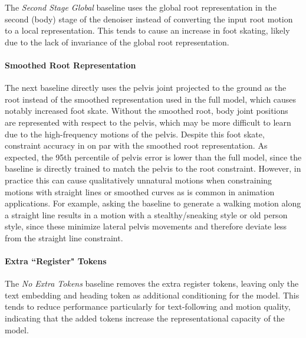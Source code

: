 The \textit{Second Stage Global} baseline uses the global root representation in the second (body) stage of the denoiser instead of converting the input root motion to a local representation. This tends to cause an increase in foot skating, likely due to the lack of invariance of the global root representation.

\paragraph{Smoothed Root Representation}
The next baseline directly uses the pelvis joint projected to the ground as the root instead of the smoothed representation used in the full model, which causes notably increased foot skate.
Without the smoothed root, body joint positions are represented with respect to the pelvis, which may be more difficult to learn due to the high-frequency motions of the pelvis.
Despite this foot skate, constraint accuracy in on par with the smoothed root representation.
As expected, the 95th percentile of pelvis error is lower than the full model, since the baseline is directly trained to match the pelvis to the root constraint. 
However, in practice this can cause qualitatively unnatural motions when constraining motions with straight lines or smoothed curves as is common in animation applications. For example, asking the baseline to generate a walking motion along a straight line results in a motion with a stealthy/sneaking style or old person style, since these minimize lateral pelvis movements and therefore deviate less from the straight line constraint.

\paragraph{Extra ``Register" Tokens}
The \textit{No Extra Tokens} baseline removes the extra register tokens, leaving only the text embedding and heading token as additional conditioning for the model. This tends to reduce performance particularly for text-following and motion quality, indicating that the added tokens increase the representational capacity of the model.

